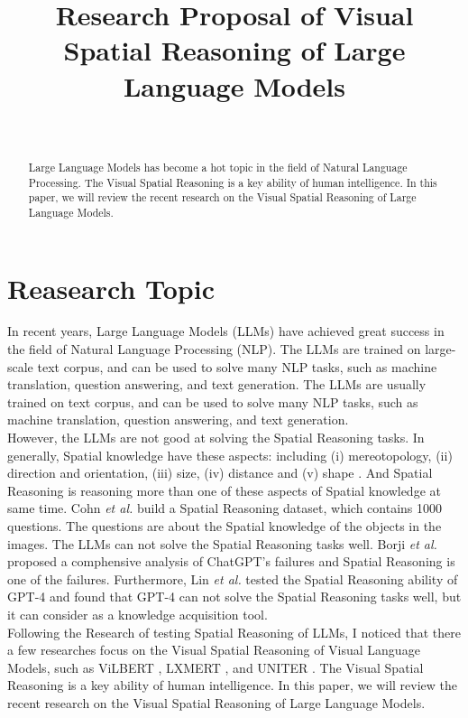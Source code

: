 \documentclass[journal,10pt]{IEEEtran}
\author{
    \IEEEauthorblockN{Jinlong Liu}\\
    \IEEEauthorblockA{Department of Computer Science, University of Liverpool
    \\J.Liu157@liverpool.ac.uk}
}
\title{Research Proposal of Visual Spatial Reasoning of Large Language Models}
\begin{document}
\maketitle
\begin{abstract}
Large Language Models has become a hot topic in the field of Natural Language Processing. The Visual Spatial Reasoning is a key ability of human intelligence. In this paper, we will review the recent research on the Visual Spatial Reasoning of Large Language Models.
\end{abstract}
\section{Reasearch Topic}
In recent years, Large Language Models (LLMs) have achieved great success in the field of Natural Language Processing (NLP). The LLMs are trained on large-scale text corpus, and can be used to solve many NLP tasks, such as machine translation, question answering, and text generation. The LLMs are usually trained on text corpus, and can be used to solve many NLP tasks, such as machine translation, question answering, and text generation.\\
However, the LLMs are not good at solving the Spatial Reasoning tasks. In generally, Spatial knowledge have these aspects: including (i) mereotopology, (ii) direction and orientation, (iii) size, (iv) distance and (v) shape \cite{cohn2008qualitative}. And Spatial Reasoning is  reasoning more than one of these aspects of Spatial knowledge at same time. Cohn \textit{et al.} \cite{cohn2023dialectical} build a Spatial Reasoning dataset, which contains 1000 questions. The questions are about the Spatial knowledge of the objects in the images. The LLMs can not solve the Spatial Reasoning tasks well. Borji \textit{et al.} \cite{borji2023categorical} proposed a comphensive analysis of ChatGPT's failures and Spatial Reasoning is one of the failures. Furthermore, Lin \textit{et al.} \cite{lin2023using} tested the Spatial Reasoning ability of GPT-4 and found that GPT-4 can not solve the Spatial Reasoning tasks well, but it can consider as a knowledge acquisition tool. \\
Following the Research of testing Spatial Reasoning of LLMs, I noticed that there a few researches focus on the Visual Spatial Reasoning of Visual Language Models, such as ViLBERT \cite{lu2019vilbert}, LXMERT \cite{tan2019lxmert}, and UNITER \cite{chen2019uniter}. The Visual Spatial Reasoning is a key ability of human intelligence. In this paper, we will review the recent research on the Visual Spatial Reasoning of Large Language Models.




\end{document}
